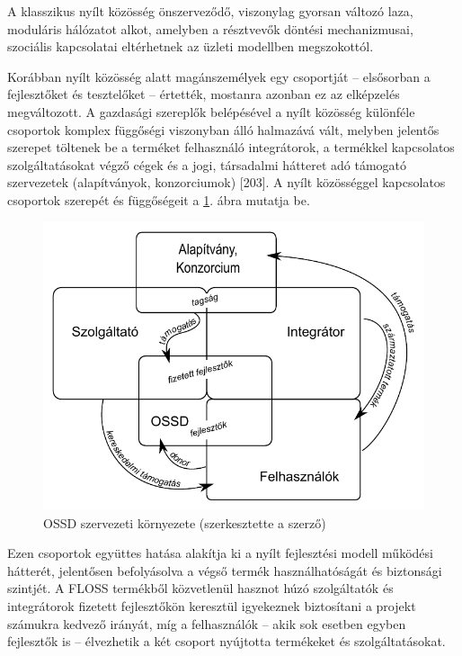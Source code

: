 \documentclass[12pt,magyar,a4paper,oneside]{scrreprt}
\begin{document}
A klasszikus nyílt közösség önszerveződő, viszonylag gyorsan változó
laza, moduláris hálózatot alkot, amelyben a résztvevők döntési
mechanizmusai, szociális kapcsolatai eltérhetnek az üzleti modellben
megszokottól.

Korábban nyílt közösség alatt magánszemélyek egy csoportját --
elsősorban a fejlesztőket és tesztelőket -- értették, mostanra azonban
ez az elképzelés megváltozott. A gazdasági szereplők belépésével a nyílt
közösség különféle csoportok komplex függőségi viszonyban álló halmazává
vált, melyben jelentős szerepet töltenek be a terméket felhasználó
integrátorok, a termékkel kapcsolatos szolgáltatásokat végző cégek és a
jogi, társadalmi hátteret adó támogató szervezetek (alapítványok,
konzorciumok) {[}203{]}. A nyílt közösséggel kapcsolatos csoportok
szerepét és függőségeit a \ref{fig:OSSDSzerv}. ábra mutatja be.

\begin{figure}
\hypertarget{fig:OSSDSzerv}{%
\centering
\includegraphics{ábrák/OSSD-szervezeti-környezete.pdf}
\caption{OSSD szervezeti környezete (szerkesztette a
szerző)}\label{fig:OSSDSzerv}
}
\end{figure}

Ezen csoportok együttes hatása alakítja ki a nyílt fejlesztési modell
működési hátterét, jelentősen befolyásolva a végső termék
használhatóságát és biztonsági szintjét. A FLOSS termékből közvetlenül
hasznot húzó szolgáltatók és integrátorok fizetett fejlesztőkön
keresztül igyekeznek biztosítani a projekt számukra kedvező irányát, míg
a felhasználók -- akik sok esetben egyben fejlesztők is -- élvezhetik a
két csoport nyújtotta termékeket és szolgáltatásokat.
\end{document}
